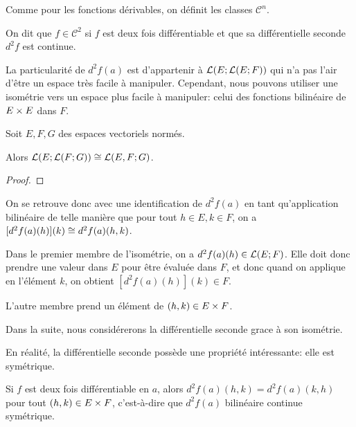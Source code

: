 Comme pour les fonctions dérivables, on définit les classes $\mathcal{C}^{n}$.

\begin{definition}
	On dit que $f \in \mathcal{C}^{2}$ si $f$ est deux fois différentiable et
	que sa différentielle seconde $d^{2}f$ est continue.
\end{definition}

La particularité de $d^{2}f(a)$ est d'appartenir à
$\mathcal{L}(E; \mathcal{L}(E; F))$ qui n'a pas l'air d'être un espace
très facile à manipuler. Cependant, nous pouvons utiliser une isométrie vers un
espace plus facile à manipuler: celui des fonctions bilinéaire de $E \times
E$ dans $F$.

\begin{proposition}
	Soit $E, F, G$ des espaces vectoriels normés.

	Alors $\mathcal{L}(E; \mathcal{L}(F; G)) \cong
	\mathcal{L}(E,F; G)$.
\end{proposition}

\ifdefined\outputproof
\begin{proof}

\end{proof}
\fi

On se retrouve donc avec une identification de $d^{2}f(a)$ en tant
qu'application bilinéaire de telle manière que pour tout $h \in E, k \in F$, on
a $[d^{2}f(a)(h)](k) \cong d^{2}f(a)(h, k)$.

Dans le premier membre de l'isométrie, on a $d^{2}f(a)(h) \in
\mathcal{L}(E; F)$. Elle doit donc prendre une valeur dans $E$ pour être
évaluée dans $F$, et donc quand on applique en l'élément $k$, on obtient
$[d^{2}f(a)(h)](k) \in F$.

L'autre membre prend un élément de $(h, k) \in E \times F$.

Dans la suite, nous considérerons la différentielle seconde grace à son
isométrie.

En réalité, la différentielle seconde possède une propriété intéressante: elle
est symétrique.

\begin{theorem}
	\label{theorem_schwarz}

	Si $f$ est deux fois différentiable en $a$, alors $d^{2}f(a)(h, k) =
	d^{2}f(a)(k, h)$ pour tout $(h, k) \in E \times F$, c'est-à-dire que
	$d^{2}f(a)$ bilinéaire continue symétrique.
\end{theorem}

